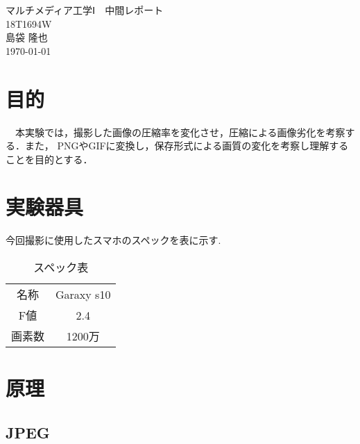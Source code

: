 \documentclass[a4paper,11pt]{bxjsarticle}
\begin{document}
\begin{titlepage}
  \begin{center}
    \vspace*{150truept}
    {\Huge マルチメディア工学Ⅰ　中間レポート}\\ %
    \vspace{120truept}
    {\huge 18T1694W}\\ %
    \vspace{50truept}
    {\huge 島袋 隆也}\\ %
    \vspace{50truept}
    {\huge \today}\\ %
  \end{center}
\end{titlepage}


\section{目的}
　本実験では，撮影した画像の圧縮率を変化させ，圧縮による画像劣化を考察する．また，
PNGやGIFに変換し，保存形式による画質の変化を考察し理解することを目的とする．


\section{実験器具}
  今回撮影に使用したスマホのスペックを表に示す. 
  \begin{table}[htb]
    \begin{center}
      \caption{スペック表}
      \begin{tabular}{|c|c|} \hline
        名称 & Garaxy s10  \\
        F値 & 2.4  \\
        画素数 & 1200万  \\ \hline

      \end{tabular}
      \label{tab:price}
    \end{center}
  \end{table}

\section{原理}
\subsection{JPEG}
\end{document}
